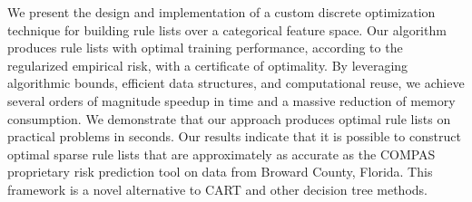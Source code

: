 We present the design and implementation of a custom discrete optimization
technique for building rule lists over a categorical feature space.
%
Our algorithm produces rule lists with optimal training performance,
according to the regularized empirical risk, with a certificate of optimality.
%
By leveraging algorithmic bounds, efficient data structures,
and computational reuse, we achieve several orders of magnitude speedup in time
and a massive reduction of memory consumption.
%
We demonstrate that our approach produces optimal rule lists on practical
problems in seconds.
%
Our results indicate that it is possible to construct optimal sparse rule lists that are
approximately as accurate as the COMPAS proprietary risk prediction tool on data from
Broward County, Florida.
%
This framework is a novel alternative to CART and other decision tree methods.
